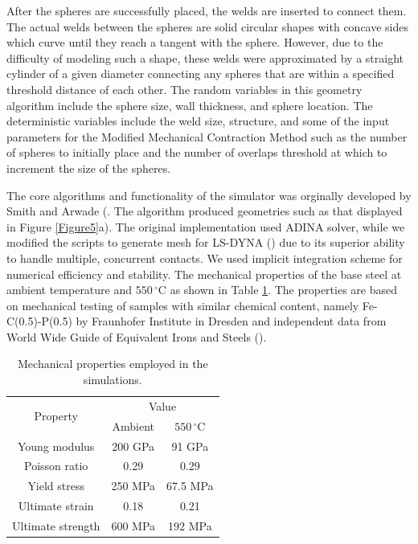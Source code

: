 \documentclass[review]{elsarticle}
\begin{document}
{After the spheres are successfully placed, the welds are inserted to connect them. The actual welds between the spheres are solid circular shapes with concave sides which curve until they reach a tangent with the sphere. However, due to the difficulty of modeling such a shape, these welds were approximated by a straight cylinder of a given diameter connecting any spheres that are within a specified threshold distance of each other. The random variables in this geometry algorithm include the sphere size, wall thickness, and sphere location. The deterministic variables include the weld size, structure, and some of the input parameters for the Modified Mechanical Contraction Method such as the number of spheres to initially place and the number of overlaps threshold at which to increment the size of the spheres.

The core algorithms and functionality of the simulator was orginally developed by Smith and Arwade (\cite{Smith2012,smith_characterization_2012}. The algorithm produced geometries such as that displayed in Figure \ref{Figure5}a). The original implementation used ADINA solver, while we modified the scripts to generate mesh for LS-DYNA (\cite{hallquist_ls-dyna_2006}) due to its superior ability to handle multiple, concurrent contacts. We used implicit integration scheme for numerical efficiency and stability. The mechanical properties of the base steel at ambient temperature and $550\,^{\circ}\mathrm{C}$ as shown in Table \ref{Tab2}. The properties are based on mechanical testing of samples with similar chemical content, namely Fe-C(0.5)-P(0.5) by Fraunhofer Institute in Dresden and independent data from World Wide Guide of Equivalent Irons and Steels (\cite{cverna_worldwide_2006}).


\begin{table}[htbp]
	\centering
	\caption{Mechanical properties employed in the simulations.}
	\begin{tabular}{ccc}
		\toprule
		\multirow{2}[0]{*}{Property} & \multicolumn{2}{c}{Value} \\
		& Ambient & $550\,^{\circ}\mathrm{C}$ \\
		\midrule
		Young modulus & 200 GPa & 91 GPa \\
		Poisson ratio & 0.29  & 0.29 \\
		Yield stress & 250 MPa & 67.5 MPa \\
		Ultimate strain & 0.18  & 0.21 \\
		Ultimate strength & 600 MPa & 192 MPa \\
		\bottomrule
	\end{tabular}%
	\label{Tab2}%
\end{table}%

}
\end{document}

